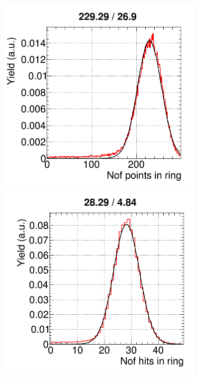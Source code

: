 \begin{figure}[H]
\begin{minipage}[t]{0.495\textwidth}
\includegraphics[width=0.9\textwidth]{pictures/RICH_nPoints_dist.png}
\end{minipage}
\begin{minipage}[t]{0.495\textwidth}
\includegraphics[width=0.9\textwidth]{pictures/RICH_nHits_dist.png}
\end{minipage}
\caption{}
\label{fig:RICHchar1}
\end{figure}

